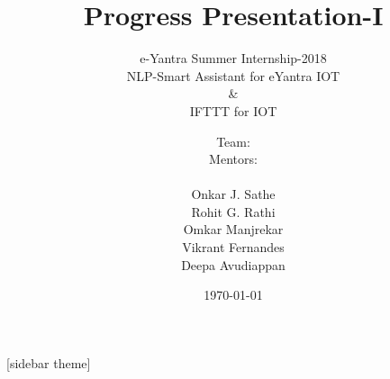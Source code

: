 \documentclass[10pt, a4paper]{beamer}
\begin{document}
	\title{Progress Presentation-I}
	\subtitle{e-Yantra Summer Internship-2018
	\vspace{0.1cm}
	\\ NLP-Smart Assistant for eYantra IOT
	\\\&
	\\IFTTT for IOT}
	\author{
		\begin{minipage}[b]{0.40\textwidth}
			\raggedleft
			\hspace{2.2cm}
			Team:
			\newline
			\vspace{0.28cm}
			\\\hspace{1.95cm}Mentors:
			\newline\\\vspace{0.45cm}
		\end{minipage}%
		\begin{minipage}[b]{0.60\textwidth}
			\raggedright
			Onkar J. Sathe
			\\Rohit G. Rathi			
			\vspace{0.3cm}
			\\Omkar Manjrekar
			\\Vikrant Fernandes
			\\Deepa Avudiappan
		\end{minipage}%
	}
	\date{\today}
	\frame{\titlepage}

[sidebar theme]
\end{document}
